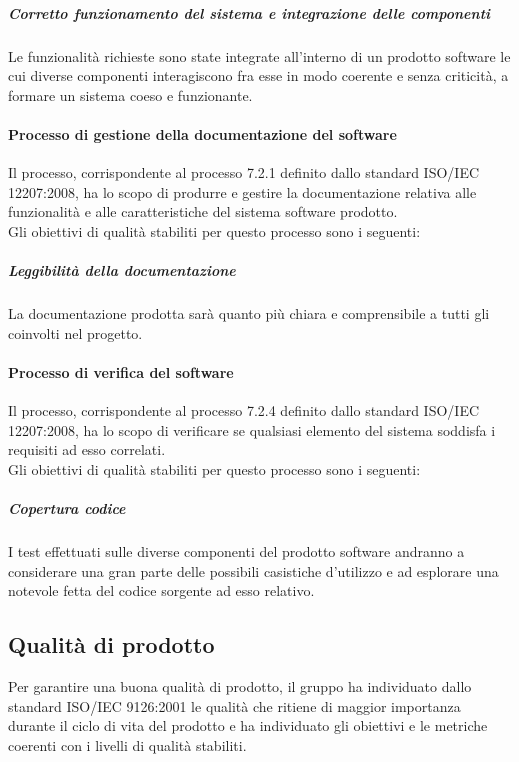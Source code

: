 				\subparagraph{Corretto funzionamento del sistema e integrazione delle componenti}
				Le funzionalità richieste sono state integrate all'interno di un prodotto software le cui diverse componenti interagiscono fra esse in modo coerente e senza criticità, a formare un sistema coeso e funzionante.
			\paragraph{Processo di gestione della documentazione del software}
			
			Il processo, corrispondente al processo 7.2.1 definito dallo standard ISO/IEC 12207:2008, ha lo scopo di produrre e gestire la documentazione relativa alle funzionalità e alle caratteristiche del sistema software prodotto.
			\\Gli obiettivi di qualità stabiliti per questo processo sono i seguenti:

				\subparagraph{Leggibilità della documentazione}
				La documentazione prodotta sarà quanto più chiara e comprensibile a tutti gli  coinvolti nel progetto.
			
			\paragraph{Processo di verifica del software}
			
			Il processo, corrispondente al processo 7.2.4 definito dallo standard ISO/IEC 12207:2008, ha lo scopo di verificare se qualsiasi elemento del sistema soddisfa i requisiti ad esso correlati.
			\\Gli obiettivi di qualità stabiliti per questo processo sono i seguenti:

				\subparagraph{Copertura codice}
				I test effettuati sulle diverse componenti del prodotto software andranno a considerare una gran parte delle possibili casistiche d'utilizzo e ad esplorare una notevole fetta del codice sorgente ad esso relativo.
	
	\subsection{Qualità di prodotto}
	Per garantire una buona qualità di prodotto, il gruppo \hx{} ha individuato dallo standard ISO/IEC 9126:2001 le qualità che ritiene di maggior importanza durante il ciclo di vita del prodotto e ha individuato gli obiettivi e le metriche coerenti con i livelli di qualità stabiliti.
